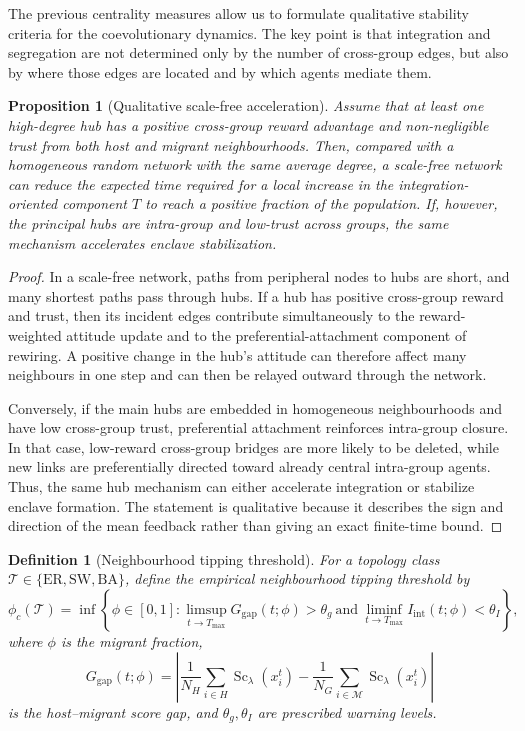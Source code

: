 \documentclass[11pt,a4paper]{article}
\newtheorem{proposition}[theorem]{Proposition}
\newtheorem{definition}[theorem]{Definition}
\begin{document}
The previous centrality measures allow us to formulate qualitative stability
criteria for the coevolutionary dynamics. The key point is that integration and
segregation are not determined only by the number of cross-group edges, but also
by where those edges are located and by which agents mediate them.

\begin{proposition}[Qualitative scale-free acceleration]
	Assume that at least one high-degree hub has a positive cross-group reward
	advantage and non-negligible trust from both host and migrant neighbourhoods.
	Then, compared with a homogeneous random network with the same average degree, a
	scale-free network can reduce the expected time required for a local increase in
	the integration-oriented component $T$ to reach a positive fraction of the
	population. If, however, the principal hubs are intra-group and low-trust across
	groups, the same mechanism accelerates enclave stabilization.
\end{proposition}

\begin{proof}
	In a scale-free network, paths from peripheral nodes to hubs are short, and many
	shortest paths pass through hubs. If a hub has positive cross-group reward and
	trust, then its incident edges contribute simultaneously to the reward-weighted
	attitude update and to the preferential-attachment component of rewiring. A
	positive change in the hub's attitude can therefore affect many neighbours in one
	step and can then be relayed outward through the network.
	
	Conversely, if the main hubs are embedded in homogeneous neighbourhoods and have
	low cross-group trust, preferential attachment reinforces intra-group closure.
	In that case, low-reward cross-group bridges are more likely to be deleted, while
	new links are preferentially directed toward already central intra-group agents.
	Thus, the same hub mechanism can either accelerate integration or stabilize
	enclave formation. The statement is qualitative because it describes the sign and
	direction of the mean feedback rather than giving an exact finite-time bound.
\end{proof}

\begin{definition}[Neighbourhood tipping threshold]
	For a topology class $\mathcal T\in\{\mathrm{ER},\mathrm{SW},\mathrm{BA}\}$,
	define the empirical neighbourhood tipping threshold by
	\[
	\phi_c(\mathcal T)
	=
	\inf
	\left\{
	\phi\in[0,1]:
	\limsup_{t\to T_{\max}}G_{\mathrm{gap}}(t;\phi)>\theta_g
	\ \text{and}\
	\liminf_{t\to T_{\max}}I_{\mathrm{int}}(t;\phi)<\theta_I
	\right\},
	\]
	where $\phi$ is the migrant fraction,
	\[
	G_{\mathrm{gap}}(t;\phi)
	=
	\left|
	\frac{1}{N_H}\sum_{i\in H}\operatorname{Sc}_{\lambda}(x_i^t)
	-
	\frac{1}{N_G}\sum_{i\in\mathcal M}\operatorname{Sc}_{\lambda}(x_i^t)
	\right|
	\]
	is the host--migrant score gap, and $\theta_g,\theta_I$ are prescribed warning
	levels.
\end{definition}
\end{document}

